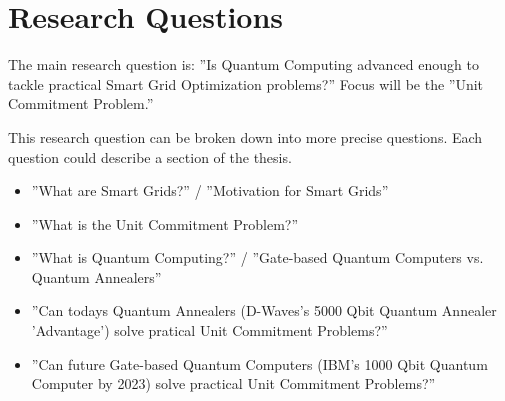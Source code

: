 \section{Research Questions}

The main research question is:
''Is Quantum Computing advanced enough to tackle practical
Smart Grid Optimization problems?''
Focus will be the ''Unit Commitment Problem.''

This research question can be broken down into more precise questions.
Each question could describe a section of the thesis.
\begin{itemize}
  \item ''What are Smart Grids?'' / ''Motivation for Smart Grids''
  \item ''What is the Unit Commitment Problem?''
  \item ''What is Quantum Computing?''
    / ''Gate-based Quantum Computers vs. Quantum Annealers''
  \item ''Can todays Quantum Annealers (D-Waves's 5000 Qbit Quantum Annealer 'Advantage') solve pratical Unit Commitment Problems?''
  \item ''Can future Gate-based Quantum Computers (IBM's 1000 Qbit Quantum Computer by 2023) solve practical Unit Commitment Problems?''
\end{itemize}